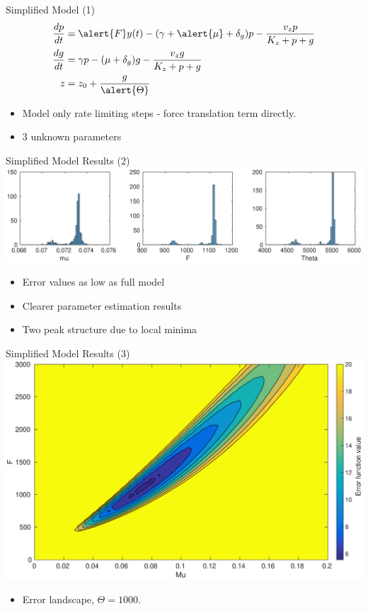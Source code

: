 \documentclass{beamer}
\begin{document}
\begin{frame}{Simplified Model (1)}
\begin{align*}
\frac{dp}{dt} & = \alert{F}y(t)-(\gamma + \alert{\mu} + \delta_{g})p - \frac{v_{z}p}{K_{z}+p+g}   \\
\frac{dg}{dt} & = \gamma p - (\mu + \delta_{g})g - \frac{v_{z}g}{K_{z}+p+g}  \\
z &= z_{0} +\frac{g}{\alert{\Theta}} 
\end{align*}
\begin{itemize}
\item  Model only rate limiting steps - force translation term directly.
\item 3 unknown parameters
\end{itemize}
\end{frame}


\begin{frame}{Simplified Model Results (2)}
  \includegraphics[scale = 0.28, clip = true, trim = 100 0 0 400]{../Figures/13_9_hist_simplified}
  \begin{itemize}
\item  Error values as low as full model
\item Clearer parameter estimation results
\item Two peak structure due to local minima
\end{itemize}
\end{frame}

\begin{frame}{Simplified Model Results (3)}
  \includegraphics[scale = 0.25, clip = true, trim = 60 0 0 00]{../Figures/Likelihood_profile_rough}
    \begin{itemize}
\item  Error landscape, $\Theta = 1000$.
\end{itemize}
\end{frame}
\end{document}
